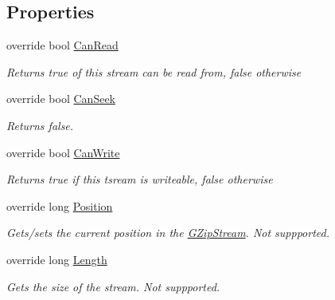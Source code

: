 \subsection*{Properties}
\begin{DoxyCompactItemize}
\item 
override bool \hyperlink{class_dot_z_lib_1_1_g_zip_stream_a3536d9e36bb8811093a13ba973c61cd8}{Can\+Read}
\begin{DoxyCompactList}\small\item\em Returns true of this stream can be read from, false otherwise \end{DoxyCompactList}\item 
override bool \hyperlink{class_dot_z_lib_1_1_g_zip_stream_a396f276d432f570ef48c0d7a56484dad}{Can\+Seek}
\begin{DoxyCompactList}\small\item\em Returns false. \end{DoxyCompactList}\item 
override bool \hyperlink{class_dot_z_lib_1_1_g_zip_stream_ac92913dd8e3dc75618073ec5b98ec739}{Can\+Write}
\begin{DoxyCompactList}\small\item\em Returns true if this tsream is writeable, false otherwise \end{DoxyCompactList}\item 
override long \hyperlink{class_dot_z_lib_1_1_g_zip_stream_a428305f6744e85cc0ad96c0395bad9cf}{Position}
\begin{DoxyCompactList}\small\item\em Gets/sets the current position in the {\ttfamily \hyperlink{class_dot_z_lib_1_1_g_zip_stream}{G\+Zip\+Stream}}. Not suppported. \end{DoxyCompactList}\item 
override long \hyperlink{class_dot_z_lib_1_1_g_zip_stream_a1f9085926146b0695ea80b8fe78d3a1b}{Length}
\begin{DoxyCompactList}\small\item\em Gets the size of the stream. Not suppported. \end{DoxyCompactList}\end{DoxyCompactItemize}


